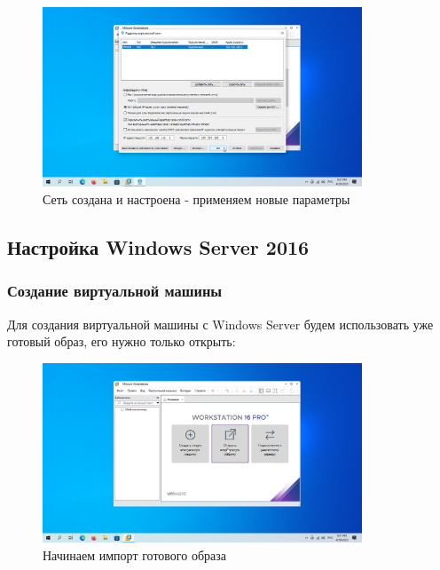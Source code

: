 \documentclass[a4paper]{article}
\begin{document}
  \begin{figure}[H]
    \centering
    \includegraphics[width=0.85\textwidth]{Screenshot_8}
    \caption{Сеть создана и настроена - применяем новые параметры}
    \label{img:8}
  \end{figure}

  \subsection{Настройка Windows Server 2016}

  \subsubsection{Создание виртуальной машины}

  Для создания виртуальной машины с Windows Server будем использовать уже готовый образ,
  его нужно только открыть:

  \begin{figure}[H]
    \centering
    \includegraphics[width=0.85\textwidth]{Screenshot_9}
    \caption{Начинаем импорт готового образа}
    \label{img:9}
  \end{figure}
\end{document}

